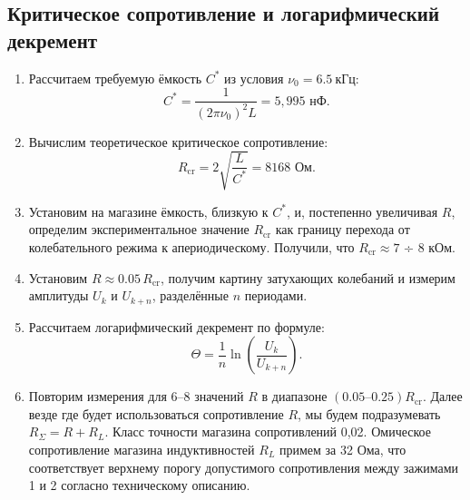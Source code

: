 \documentclass[a4paper]{article}
\begin{document}
\subsection{Критическое сопротивление и логарифмический декремент}
\begin{enumerate}
    \item Рассчитаем требуемую ёмкость $C^*$ из условия $\nu_0 = 6.5~\text{кГц}$:  
    \[
        C^* = \frac{1}{(2\pi\nu_0)^2 L} = 5,995 \text{ нФ}.
    \]
    \item Вычислим теоретическое критическое сопротивление:  
    \[
        R_{\text{cr}} = 2\sqrt{\frac{L}{C^*}} = 8168 \text{ Ом}.
    \]
    \item Установим на магазине ёмкость, близкую к $C^*$, и, постепенно увеличивая $R$, определим экспериментальное значение $R_{\text{cr}}$ как границу перехода от колебательного режима к апериодическому. Получили, что $R_{\text{cr}} \approx 7 $ ÷ $ 8$ кОм.
    \item Установим $R \approx 0.05\,R_{\text{cr}}$, получим картину затухающих колебаний и измерим амплитуды $U_k$ и $U_{k+n}$, разделённые $n$ периодами.
    \item Рассчитаем логарифмический декремент по формуле:
    \[
        \Theta = \frac{1}{n} \ln\left(\frac{U_k}{U_{k+n}}\right).
    \]
    \item Повторим измерения для 6–8 значений $R$ в диапазоне $(0.05\text{–}0.25)R_{\text{cr}}$. Далее везде где будет использоваться сопротивление $R$, мы будем подразумевать $R_\Sigma = R + R_L$. Класс точности магазина сопротивлений 0,02. Омическое сопротивление магазина индуктивностей $R_L$ примем за 32 Ома, что соответствует верхнему порогу допустимого сопротивления между зажимами 1 и 2 согласно техническому описанию.


\end{enumerate}
\end{document}
